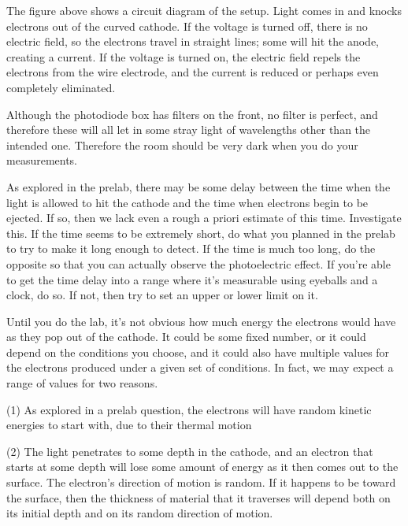 

The figure above shows a circuit diagram of the setup. Light comes in and knocks
electrons out of the curved cathode. If the voltage is
turned off, there is no electric field, so the electrons
travel in straight lines; some will hit the anode, creating
a current. If the voltage is
turned on, the electric field repels the electrons from the
wire electrode, and the current is reduced or perhaps even completely eliminated.

\observations

Although the photodiode box has filters on the front, no filter is perfect, and therefore these will
all let in some stray light of wavelengths other than the intended one. Therefore
the room should be very dark when you do your measurements.


As explored in the prelab, there may be some
delay between the time when the light
is allowed to hit the cathode and the time when electrons begin to be ejected.
If so, then we lack even a rough a priori estimate of this time.
Investigate this. If the time seems to be extremely short, do what you planned in the
prelab to try to make it long enough to detect. If the time is much too long, do the
opposite so that you can actually observe the photoelectric effect. If you're able to get the time
delay into a range where it's measurable using eyeballs and a clock, do so. If not,
then try to set an upper or lower limit on it.


Until you do the lab, it's not obvious how much energy the electrons would have
as they pop out of the cathode. It could be some fixed number, or it could depend on the
conditions you choose, and it could also have multiple values for the electrons produced
under a given set of conditions. In fact, we may expect a range of values for two reasons.

(1) As explored in a prelab question, the electrons will have random kinetic energies to start
with, due to their thermal motion

(2) The light penetrates to some depth in the cathode,
and an electron that starts at some depth will lose some amount of energy as it then comes out
to the surface. The electron's direction of motion is random. If it happens to be toward the
surface, then the thickness of material that it traverses will depend both on its initial
depth and on its random direction of motion.

